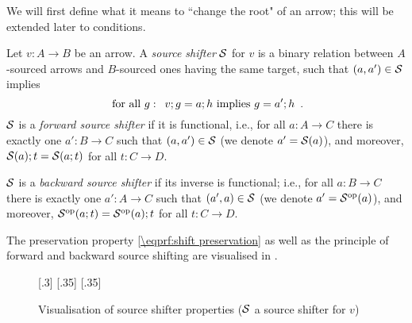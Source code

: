 We will first define what it means to ``change the root" of an arrow; this will be extended later to conditions.
%
\begin{definition}
Let $v:A\to B$ be an arrow. A \emph{source shifter} $\mathcal{S}$ for $v$ is a binary relation between $A$-sourced arrows and $B$-sourced ones having the same target, such that $(a,a')\in \mathcal{S}$ implies
%
\begin{equation}\eqlabel{shift preservation}
\text{ for all } g: \enspace v;g=a;h \text{ implies } g=a';h \enspace.
\end{equation}
%
$\mathcal{S}$ is a \emph{forward source shifter} if it is functional, i.e., for all $a:A\to C$ there is exactly one $a':B\to C$ such that $(a,a')\in \mathcal{S}$ (we denote $a'={\mathcal{S}}(a)$), and moreover, ${\mathcal{S}}(a);t={\mathcal{S}}(a;t)$ for all $t:C\to D$.

$\mathcal{S}$ is a \emph{backward source shifter} if its inverse is functional; i.e., for all $a:B\to C$ there is exactly one $a':A\to C$ such that $(a',a)\in \mathcal{S}$ (we denote $a'={\mathcal{S}}^{\mathrm{op}}(a)$), and moreover, ${\mathcal{S}}^{\mathrm{op}}(a;t)={\mathcal{S}}^{\mathrm{op}}(a);t$ for all $t:C\to D$.
\end{definition}
%
The preservation property \eqref{\eqprf:shift preservation} as well as the principle of forward and backward source shifting are visualised in .
%
\begin{figure}
\centering
{}[.3\textwidth]
              {}%
[.35\textwidth]{}%
[.35\textwidth]{}%
\caption{Visualisation of source shifter properties ($\mathcal{S}$ a source shifter for $v$)}
\end{figure}

